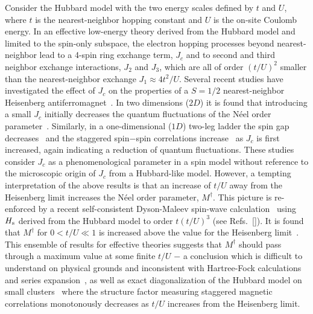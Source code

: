 \documentclass[aps,prb,twocolumn,superscriptaddress,
               amsmath]{revtex4}
\renewcommand{\=}{\,=\,}
\newcommand{\+}{\,+\,}
\renewcommand{\-}{\,-\,}
\begin{document}
Consider the Hubbard model with the two energy 
scales defined by $t$ and $U$, where $t$ is the
nearest-neighbor hopping constant and $U$ is the on-site Coulomb energy.
In an effective low-energy theory derived from the Hubbard model and
limited to the spin-only subspace, the
electron hopping processes beyond nearest-neighbor lead to a
4-spin ring exchange term, $J_c$ and to second and third neighbor
exchange interactions, $J_2$ and $J_3$, which are all of order
$(t/U)^2$ smaller than the nearest-neighbor exchange $J_1 \approx
4t^2/U$. Several recent studies have investigated the effect of
$J_c$ on the properties of a $S=1/2$ nearest-neighbor Heisenberg
antiferromagnet~\cite{Lorenzana,Honda,Lauchli,Honda-chain}. In two
dimensions ($2D$) it is found that introducing  a small $J_c$
initially decreases the quantum fluctuations of the N\'eel order
parameter~\cite{Lorenzana,Honda}. Similarly, in a one-dimensional
($1D$) two-leg ladder the spin gap
decreases~\cite{Lauchli,Honda-chain} and the staggered spin$-$spin
correlations increase~\cite{Honda-chain} as $J_c$ is first
increased, again indicating a reduction of quantum fluctuations.
These studies consider $J_c$ as a phenomenological parameter in a
spin model without reference to the microscopic origin of $J_c$
from a Hubbard-like model. However, a tempting interpretation of
the above results is that an increase of $t/U$ away from the
Heisenberg limit increases the N\'eel order parameter,
$M^\dagger$. This picture is re-enforced by a recent
self-consistent Dyson-Maleev spin-wave calculation~\cite{Katanin}
using $H_{\rm s}$ derived from the Hubbard model to order
$t(t/U)^3$ (see Refs.~[]). 
It is found that
$M^\dagger$ for $0< t/U\ll 1$ is increased above the value for the
Heisenberg limit~\cite{Katanin}. This ensemble of results for
effective theories suggests that $M^\dagger$ should pass through a
maximum value at some finite $t/U$ $-$ a conclusion which is
difficult to understand on physical grounds and inconsistent with
Hartree-Fock calculations~\cite{Schrieffer-RPA} and  series expansion~\cite{Shi}, as well as exact diagonalization of the Hubbard model on small clusters~\cite{Fano} where the structure factor measuring staggered magnetic correlations monotonously decreases as $t/U$ increases from the Heisenberg limit.
\end{document}
